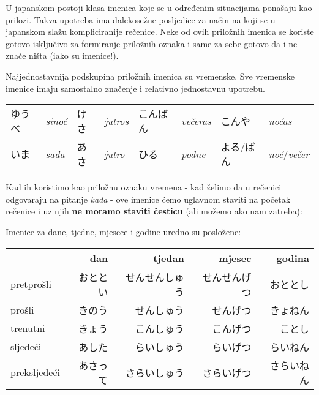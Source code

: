 
\author{Tomislav Mamić}

	
	
	U japanskom postoji klasa imenica koje se u određenim situacijama ponašaju kao prilozi. Takva upotreba ima dalekosežne posljedice za način na koji se u japanskom slažu kompliciranije rečenice. Neke od ovih priložnih imenica se koriste gotovo isključivo za formiranje priložnih oznaka i same za sebe gotovo da i ne znače ništa (iako su imenice!).
	
	Najjednostavnija podskupina priložnih imenica su vremenske. Sve vremenske imenice imaju samostalno značenje i relativno jednostavnu upotrebu.
	
	
	\begin{tabular}{l l l l l l l l}
		ゆうべ & \textit{sinoć} & けさ & \textit{jutros} & こんばん & \textit{večeras} & こんや & \textit{noćas}\\
 		いま & \textit{sada} & あさ & \textit{jutro} & ひる & \textit{podne} & よる/ばん & \textit{noć}/\textit{večer}\\
	\end{tabular}

	\vspace{10pt}
	Kad ih koristimo kao priložnu oznaku vremena - kad želimo da u rečenici odgovaraju na pitanje \textit{kada} - ove imenice ćemo uglavnom staviti na početak rečenice i uz njih \textbf{ne moramo staviti česticu} (ali možemo ako nam zatreba):
	
	\begin{reibun}
	\end{reibun}

	Imenice za dane, tjedne, mjesece i godine uredno su posložene:
	
	\begin{table}[h]
		\centering
		\begin{tabular}{l r r r r}\toprule[2pt]
			& dan & tjedan & mjesec & godina \\
			\midrule
			pretprošli 		& おととい & せんせんしゅう & せんせんげつ & おととし \\
			prošli 			& きのう & せんしゅう & せんげつ & きょねん \\
			trenutni 		& きょう & こんしゅう & こんげつ & ことし \\
			sljedeći 		& あした & らいしゅう & らいげつ & らいねん \\
			preksljedeći 	& あさって & さらいしゅう & さらいげつ & さらいねん \\
			\bottomrule[2pt]
		\end{tabular}
	\end{table}
	
